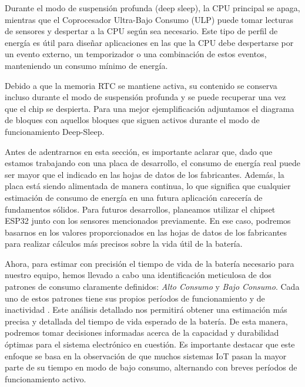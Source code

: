
Durante el modo de suspensión profunda (deep sleep), la CPU principal se apaga, mientras
que el Coprocesador Ultra-Bajo Consumo (ULP) puede tomar lecturas de sensores y
despertar a la CPU según sea necesario. Este tipo de perfil de energía es útil para
diseñar aplicaciones en las que la CPU debe despertarse por un evento externo, un
temporizador o una combinación de estos eventos, manteniendo un consumo mínimo de
energía.

Debido a que la memoria RTC se mantiene activa, su contenido se conserva incluso durante
el modo de suspensión profunda y se puede recuperar una vez que el chip se despierta.
Para una mejor ejemplificación adjuntamos el diagrama de bloques con aquellos bloques
que siguen activos durante el modo de funcionamiento Deep-Sleep.


Antes de adentrarnos en esta sección, es importante aclarar que, dado que estamos trabajando con una placa de desarrollo, el consumo de energía real puede ser mayor que el indicado en las hojas de datos de los fabricantes. Además, la placa está siendo alimentada de manera continua, lo que significa que cualquier estimación de consumo de energía en una futura aplicación carecería de fundamentos sólidos. Para futuros desarrollos, planeamos utilizar el chipset ESP32 junto con los sensores mencionados previamente. En ese caso, podremos basarnos en los valores proporcionados en las hojas de datos de los fabricantes para realizar cálculos más precisos sobre la vida útil de la batería.

Ahora, para estimar con precisión el tiempo de vida de la batería necesario para nuestro equipo, hemos llevado a cabo una identificación meticulosa de dos patrones de consumo claramente definidos: \textit{Alto Consumo} y \textit{Bajo Consumo}. Cada uno de estos patrones tiene sus propios períodos de funcionamiento  y de inactividad . Este análisis detallado nos permitirá obtener una estimación más precisa y detallada del tiempo de vida esperado de la batería. De esta manera, podremos tomar decisiones informadas acerca de la capacidad y durabilidad óptimas para el sistema electrónico en cuestión. Es importante destacar que este enfoque se basa en la observación de que muchos sistemas IoT pasan la mayor parte de su tiempo en modo de bajo consumo, alternando con breves períodos de funcionamiento activo.

